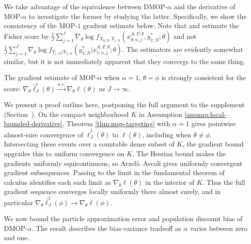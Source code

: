 \documentclass[numsec,webpdf,modern,medium,namedate]{oup-authoring-template}
\begin{document}
We take advantage of the equivalence between DMOP-$\alpha$ and the derivative of MOP-$\alpha$ to investigate the former by studying the latter.
Specifically, we show the consistency of the MOP-$1$ gradient estimate below.
Note that \cite{poyiadjis11} and \cite{scibior21} estimate the Fisher score by 
$\frac{1}{J}\sum_{j=1}^J \nabla_\theta \log f_{X_{0:N}, Y_{1:N}}(x_{0:n,j}^{A, F,\theta}, y_{1:N}^* ; \theta)$ and not
$\frac{1}{J}\sum_{j=1}^J \nabla_\theta \log f_{Y_{1:N}| X_{1:N}}(y_{1:N}^* | x_{1:n,j}^{A, F,\theta}; \theta).$
The estimators are evidently somewhat similar, but it is not immediately apparent that they converge to the same thing.

\begin{thm}
    The gradient estimate of MOP-$\alpha$ when $\alpha=1$, $\theta=\phi$ is strongly consistent for the score: $\nabla_\theta \hat\ell_J^1(\theta) \stackrel{a.s.}{\to} \nabla_\theta \ell(\theta)$ as $J \to \infty$.
    \label{thm:mop-grad-consistency}
\end{thm}

We present a proof outline here, postponing the full argument to the supplement (Section~\suppSecProofConsistency).
On the compact neighborhood $K$ in Assumption \ref{assump:local-bounded-derivative}, Theorem \ref{thm:mop-targeting} with $\alpha=1$ gives pointwise almost-sure convergence of $\hat\ell_J^1(\theta)$ to $\ell(\theta)$, including when $\theta\ne\phi$. Intersecting these events over a countable dense subset of $K$, the gradient bound upgrades this to uniform convergence on $K$. The Hessian bound makes the gradients uniformly equicontinuous, so Arzel\`a--Ascoli gives uniformly convergent gradient subsequences. Passing to the limit in the fundamental theorem of calculus identifies each such limit as $\nabla_\theta\ell(\theta)$ in the interior of $K$. Thus the full gradient sequence converges locally uniformly there almost surely, and in particular $\nabla_\theta\hat\ell_J^1(\phi)\to\nabla_\theta\ell(\phi)$.

We now bound the particle approximation error and population discount bias of DMOP-$\alpha$.
The result describes the bias-variance tradeoff as $\alpha$ varies between zero and one.
\end{document}
